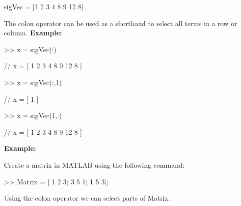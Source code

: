 \documentclass[11pt]{article}
\begin{document}
\begin{center}
sigVec = [1 2 3 4 8 9 12 8]
\end{center} 

The colon operator can be used as a shorthand to select all terms in a row or column.\newline
\textbf{Example:} 

\begin{center}

>> x = sigVec(:)



\end{center}

\begin{center}


// x  = [ 1 2 3 4 8 9 12 8 ] 


\end{center}

\vspace{4mm}

\begin{center}

>> x = sigVec(:,1)



\end{center}

\begin{center}


// x  = [ 1  ] 


\end{center}

\begin{center}

>> x = sigVec(1,:)



\end{center}

\begin{center}


// x  = [ 1 2 3 4 8 9 12 8 ] 


\end{center}


\textbf{Example:} 

Create a matrix in MATLAB using the following command:
\begin{center}


>> Matrix = [ 1 2 3; 3 5 1; 1 5 3];


\end{center}


\vspace{4mm}

Using the colon operator we can select parts of Matrix.
\end{document}
